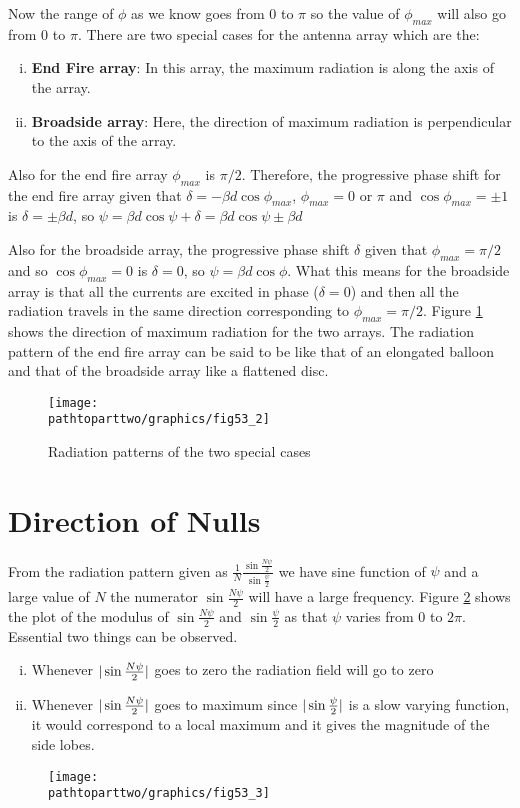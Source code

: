 Now the range of $\phi$ as we know goes from $0$ to $\pi$ so the value of $\phi_{max}$ will also go from $0$ to $\pi$.
There are two special cases for the antenna array which are the:
\begin{enumerate}[(i)]
\item \textbf{End Fire array}: In this array, the maximum radiation is along the axis of the array. 
\item \textbf{Broadside array}: Here, the direction of maximum radiation is perpendicular to the axis of the array.
\end{enumerate}

Also for the end fire array $\phi_{max}$ is $\pi/2$. Therefore, the progressive phase shift for the end fire array given that $\delta = -\beta d\cos{\phi_{max}}$, $\phi_{max}=0$ or $\pi$ and $\cos{\phi_{max}} = \pm 1$ is $\delta = \pm \beta d$, so $\psi = \beta d \cos{\psi} + \delta = \beta d \cos{\psi} \pm \beta d $

Also for the broadside array, the progressive phase shift $\delta$ given that $\phi_{max} = \pi/2$ and so $\cos\phi_{max} = 0$ is $\delta = 0$, so $\psi = \beta d \cos{\phi}$. What this means for the broadside array is that all the currents are excited in phase ($\delta = 0$) and then all the radiation travels in the same direction corresponding to $\phi_{max} = \pi /2$. Figure \ref{53.2} shows the direction of maximum radiation for the two arrays. The radiation pattern of the end fire array can be said to be like that of an elongated balloon and that of the broadside array like a flattened disc.
\begin{figure}[h]
\centering
\texttt{[image: \\pathtoparttwo/graphics/fig53\_2]}
\caption{Radiation patterns of the two special cases}
\label{53.2}
\end{figure}

\section{Direction of Nulls}
From the radiation pattern given as $\frac{1}{N} \frac{\sin{\frac{N\psi}{2}}}{\sin{\frac{\psi}{2}}} $ we have sine function of $\psi$ and a large value of $N$ the numerator $\sin{\frac{N\psi}{2}} $ will have a large frequency. Figure \ref{53.3} shows the plot of the modulus of $\sin{\frac{N\psi}{2}}$ and $\sin{\frac{\psi}{2}}$ as that $\psi$ varies from $0$ to $2\pi$. Essential two things can be observed. 
\begin{enumerate}[(i)]
\item Whenever $\arrowvert \sin{\frac{N\psi}{2}} \arrowvert$ goes to zero the radiation field will go to zero 
\item Whenever $\arrowvert \sin{\frac{N\psi}{2}} \arrowvert$ goes to maximum since $\arrowvert \sin{\frac{\psi}{2}} \arrowvert$ is a slow varying function, it would correspond to a local maximum and it gives the magnitude of the side lobes.
\end{enumerate}
\begin{figure}[h]
\centering
\texttt{[image: \\pathtoparttwo/graphics/fig53\_3]}
\caption{}
\label{53.3}
\end{figure}

